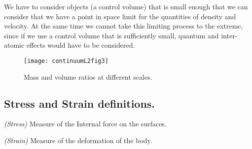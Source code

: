 We have to consider objects (a control volume) that is small enough that we can consider that we have a point in space limit for the quantities of density and velocity.  At the same time we cannot take this limiting process to the extreme, since if we use a control volume that is sufficiently small, quantum and inter-atomic effects would have to be considered.

\begin{figure}[htp]
   \centering
   \texttt{[image: continuumL2fig3]}
   \caption{Mass and volume ratios at different scales.}\label{fig:continuumL2:continuumL2fig3}
\end{figure}

\subsection{Stress and Strain definitions.}

\begin{definition}
\emph{(Stress)}
\label{dfn:continuumL2:10}
Measure of the Internal force on the surfaces.
\end{definition}

\begin{definition}
\emph{(Strain)}
\label{dfn:continuumL2:30}
Measure of the deformation of the body.
\end{definition}

